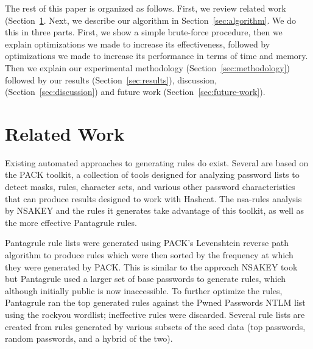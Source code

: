 \documentclass[letterpaper,twocolumn,10pt]{article}
\begin{document}
The rest of this paper is organized as follows. First, we review related work (Section~\ref{sec:related-work}. Next, we describe our algorithm in Section~\ref{sec:algorithm}. We do this in three parts. First, we show a simple brute-force procedure, then we explain optimizations we made to increase its effectiveness, followed by optimizations we made to increase its performance in terms of time and memory. Then we explain our experimental methodology (Section~\ref{sec:methodology}) followed by our results (Section~\ref{sec:results}), discussion, (Section~\ref{sec:discussion}) and future work (Section~\ref{sec:future-work}).




\section{Related Work}
\label{sec:related-work}

Existing automated approaches to generating rules do exist. Several are based
on the PACK toolkit,\cite{PACK} a collection of tools designed for analyzing
password lists to detect masks, rules, character sets, and various other
password characteristics that can produce results designed to work with
Hashcat. The nsa-rules analysis by NSAKEY\cite{NSAKEY} and the rules it
generates take advantage of this toolkit, as well as the more effective
Pantagrule rules.\cite{pantagrule}

Pantagrule rule lists were generated using PACK's Levenshtein reverse path
algorithm to produce rules which were then sorted by the frequency at which
they were generated by PACK. This is similar to the approach NSAKEY took but
Pantagrule used a larger set of base passwords to generate rules, which
although initially public is now inaccessible. To further optimize the rules,
Pantagrule ran the top generated rules against the Pwned Passwords NTLM list
using the rockyou wordlist; ineffective rules were discarded. Several rule lists
are created from rules generated by various subsets of the seed data (top
passwords, random passwords, and a hybrid of the two).
\end{document}
